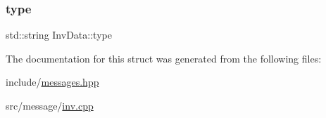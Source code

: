 \mbox{\label{structInvData_a65d4044e395865238407578784cfccea}} 
\subsubsection{\texorpdfstring{type}{type}}
{\footnotesize\ttfamily std\+::string Inv\+Data\+::type}



The documentation for this struct was generated from the following files\+:\begin{DoxyCompactItemize}
\item 
include/\mbox{\hyperlink{messages_8hpp}{messages.\+hpp}}\item 
src/message/\mbox{\hyperlink{inv_8cpp}{inv.\+cpp}}\end{DoxyCompactItemize}
